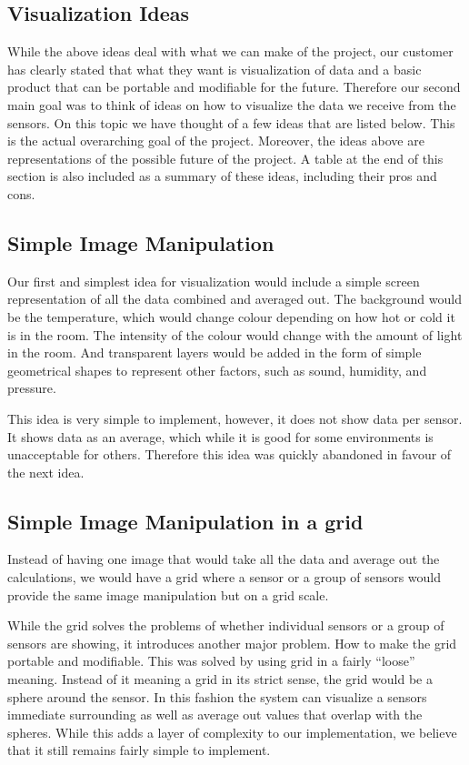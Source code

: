 \documentclass[../document.tex]{subfiles}
\begin{document}
\subsection{Visualization Ideas}
While the above ideas deal with what we can make of the project, our customer has clearly stated that what they want is visualization of data and a basic product that can be portable and modifiable for the future. Therefore our second main goal was to think of ideas on how to visualize the data we receive from the sensors. On this topic we have thought of a few ideas that are listed below. This is the actual overarching goal of the project. Moreover, the ideas above are representations of the possible future of the project. A table at the end of this section is also included as a summary of these ideas, including their pros and cons.

\subsection{Simple Image Manipulation}
Our first and simplest idea for visualization would include a simple screen representation of all the data combined and averaged out. The background would be the temperature, which would change colour depending on how hot or cold it is in the room. The intensity of the colour would change with the amount of light in the room. And transparent layers would be added in the form of simple geometrical shapes to represent other factors, such as sound, humidity, and pressure.

This idea is very simple to implement, however, it does not show data per sensor. It shows data as an average, which while it is good for some environments is unacceptable for others. Therefore this idea was quickly abandoned in favour of the next idea.

\subsection{Simple Image Manipulation in a grid}
Instead of having one image that would take all the data and average out the calculations, we would have a grid where a sensor or a group of sensors would provide the same image manipulation but on a grid scale.

While the grid solves the problems of whether individual sensors or a group of sensors are showing, it introduces another major problem. How to make the grid portable and modifiable. This was solved by using grid in a fairly ``loose'' meaning. Instead of it meaning a grid in its strict sense, the grid would be a sphere around the sensor. In this fashion the system can visualize a sensors immediate surrounding as well as average out values that overlap with the spheres. While this adds a layer of complexity to our implementation, we believe that it still remains fairly simple to implement.
\end{document}
